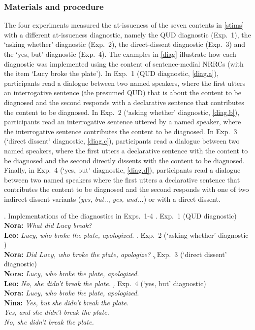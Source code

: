 \documentclass[times,linguex,xcolor]{glossa}
\begin{document}
  \subsubsection{Materials and procedure}
  
  The four experiments measured the at-issueness of the seven contents in \ref{stims} with a different at-issueness diagnostic, namely the QUD diagnostic (Exp.~1), the `asking whether' diagnostic (Exp.~2), the direct-dissent diagnostic (Exp.~3) and the `yes, but' diagnostic (Exp.~4). The examples in \ref{diag} illustrate how each diagnostic was implemented using the content of sentence-medial NRRCs (with the item `Lucy broke the plate'). In Exp.~1 (QUD diagnostic, \ref{diag.a}), participants read a dialogue between two named speakers, where the first utters an interrogative sentence (the presumed QUD) that is about the content to be diagnosed and the second responds with a declarative sentence that contributes the content to be diagnosed. In Exp.~2 (`asking whether' diagnostic, \ref{diag.b}), participants read an interrogative sentence uttered by a named speaker, where the interrogative sentence contributes the content to be diagnosed. In Exp.~3 (`direct dissent' diagnostic, \ref{diag.c}), participants read a dialogue between two named speakers, where the first utters a declarative sentence with the content to be diagnosed and the second directly dissents with the content to be diagnosed. Finally, in Exp.~4 (`yes, but' diagnostic, \ref{diag.d}), participants read a dialogue between two named speakers where the first utters a declarative sentence that contributes the content to be diagnosed and the second responds with one of two indirect dissent variants (\emph{yes, but..}, \emph{yes, and...}) or with a direct dissent.

  \ex.\label{diag} Implementations of the diagnostics in Exps.~1-4
  \a.\label{diag.a} Exp.~1 (QUD diagnostic)
  \\ {\bf Nora:} \emph{What did Lucy break?}
  \\ {\bf Leo:} \emph{Lucy, who broke the plate, apologized.}
  \b.\label{diag.b} Exp.~2 (`asking whether' diagnostic )
  \\ {\bf Nora:} \emph{Did Lucy, who broke the plate, apologize?}
  \c.\label{diag.c} Exp.~3 (`direct dissent' diagnostic)
  \\ {\bf Nora:} \emph{Lucy, who broke the plate, apologized.}
  \\ {\bf Leo:} \emph{No, she didn't break the plate.}
  \d.\label{diag.d} Exp.~4 (`yes, but' diagnostic)
  \\ {\bf Nora:} \emph{Lucy, who broke the plate, apologized.}
  \\ {\bf Nina:} \emph{Yes, but she didn't break the plate.}
  \\ \hspace*{1cm} \emph{Yes, and she didn't break the plate.}
  \\ \hspace*{1cm} \emph{No, she didn't break the plate.}
\end{document}
